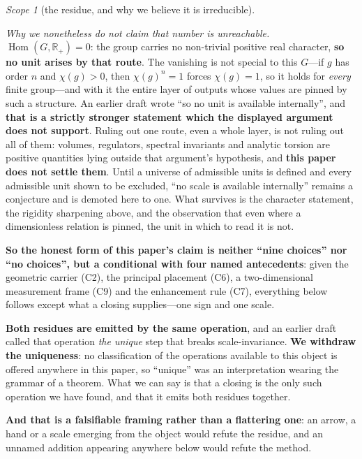 \documentclass[11pt,reqno]{amsart}
\theoremstyle{plain}
\theoremstyle{definition}
\theoremstyle{remark}
\newtheorem{scope}[theorem]{Scope}
\newcommand{\R}{\mathbb{R}}
\begin{document}
\begin{scope}[the residue, and why we believe it is irreducible]
\begin{description}[leftmargin=1.9em,style=nextline,itemsep=2pt]
  \emph{Why we nonetheless do not claim that number is unreachable.}
  $\operatorname{Hom}(G,\R_+)=0$: the group carries no non-trivial positive real character,
  \textbf{so no unit arises by that route}. The vanishing is not special to this
  $G$---if $g$ has order $n$ and $\chi(g)>0$, then $\chi(g)^{n}=1$ forces $\chi(g)=1$, so
  it holds for \emph{every} finite group---and with it the entire layer of outputs whose
  values are pinned by such a structure. An earlier draft wrote ``so no unit is available
  internally'', and \textbf{that is a strictly stronger statement which the displayed
  argument does not support}. Ruling out one route, even a whole layer, is not ruling out
  all of them: volumes, regulators, spectral invariants and analytic torsion are positive
  quantities lying outside that argument's hypothesis, and \textbf{this paper does not
  settle them}. Until a universe of admissible units is defined and every admissible unit
  shown to be excluded, ``no scale is available internally'' remains a conjecture and is
  demoted here to one. What survives is the character statement, the rigidity sharpening
  above, and the observation that even where a dimensionless relation is pinned, the unit
  in which to read it is not.
\end{description}

\noindent\textbf{So the honest form of this paper's claim is neither ``nine choices''
nor ``no choices'', but a conditional with four named antecedents}: given the geometric
carrier (C2), the principal placement (C6), a two-dimensional measurement frame (C9) and
the enhancement rule (C7), everything below follows except what a closing supplies---one
sign and one scale.

\textbf{Both residues are emitted by the same operation}, and an earlier draft called
that operation \emph{the unique} step that breaks scale-invariance. \textbf{We withdraw
the uniqueness}: no classification of the operations available to this object is offered
anywhere in this paper, so ``unique'' was an interpretation wearing the grammar of a
theorem. What we can say is that a closing is the only such operation we have found, and
that it emits both residues together.

\textbf{And that is a falsifiable framing rather than a flattering one}: an arrow, a hand
or a scale emerging from the object would refute the residue, and an unnamed addition
appearing anywhere below would refute the method.
\end{scope}
\end{document}

